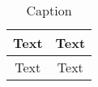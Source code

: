 \begin{table}[]
    \centering
    \begin{tabular}{c c}
        \hline
        Text & Text  \\
        \hline
        Text & Text \\
        \hline
    \end{tabular}
    \caption{Caption}
    \label{tab:my_label}
\end{table}